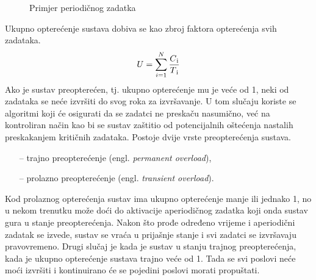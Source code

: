 \documentclass[../zavrsni.tex]{subfiles}
\begin{document}
  \begin{figure}[!htb]
    \caption{\label{fig:my-label} Primjer periodičnog zadatka}
  \end{figure}

Ukupno opterećenje sustava dobiva se kao zbroj faktora opterećenja svih zadataka. 
\begin{equation*}
    U = \sum_{i=1}^{N}\frac{C\textsubscript{i}}{T\textsubscript{i}}
\end{equation*}
Ako je sustav preopterećen, tj. ukupno opterećenje mu 
je veće od 1, neki od zadataka se neće izvršiti do svog roka za izvršavanje. U tom slučaju koriste se algoritmi koji će osigurati 
da se zadatci ne preskaču nasumično, već na kontroliran način kao bi se sustav zaštitio od potencijalnih oštećenja nastalih preskakanjem 
kritičnih zadataka. Postoje dvije vrste preopterećenja sustava.
\begin{itemize}
    \item[--] trajno preopterećenje (engl. \textit{permanent overload}),
    \item[--] prolazno preopterećenje (engl. \textit{transient overload}).
\end{itemize}
Kod prolaznog opterećenja sustav ima ukupno opterećenje manje ili jednako 1, no u nekom trenutku može doći do aktivacije aperiodičnog zadatka 
koji onda sustav gura u stanje preopterećenja. Nakon što prođe određeno vrijeme i aperiodični zadatak se izvede, sustav se vraća u prijašnje
stanje i svi zadatci se izvršavaju pravovremeno. Drugi slučaj je kada je sustav u stanju trajnog preopterećenja, kada je ukupno 
opterećenje sustava trajno veće od 1. Tada se svi poslovi neće moći izvršiti i kontinuirano će se pojedini poslovi morati propuštati. 
\end{document}
